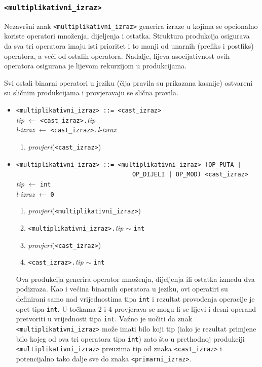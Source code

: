 \documentclass[times, 12pt, utf8]{book}
\begin{document}
\subsubsection{\texttt{<multiplikativni\_izraz>}}

Nezavršni znak \verb|<multiplikativni_izraz>| generira izraze u kojima se opcionalno koriste operatori množenja, dijeljenja i ostatka.
Struktura produkcija osigurava da sva tri operatora imaju isti prioritet i to manji od unarnih (prefiks i postfiks) operatora, a veći od ostalih operatora.
Nadalje, lijeva asocijativnost ovih operatora osigurana je lijevom rekurzijom u produkcijama.

Svi ostali binarni operatori u jeziku (čija pravila su prikazana kasnije) ostvareni su sličnim produkcijama i provjeravaju se slična pravila.

\begin{itemize}

\item
\verb|<multiplikativni_izraz> ::= <cast_izraz>|\\
\emph{tip} \(\leftarrow\) \verb|<cast_izraz>.|\emph{tip}\\
\emph{l-izraz} \(\leftarrow\) \verb|<cast_izraz>.|\emph{l-izraz}
\begin{enumerate}
\item
\emph{provjeri}(\verb|<cast_izraz>|)
\end{enumerate}

\item
\verb#<multiplikativni_izraz> ::= <multiplikativni_izraz> (OP_PUTA | #\\
\verb#                                OP_DIJELI | OP_MOD) <cast_izraz>#\\
\emph{tip} \(\leftarrow\) \verb|int|\\
\emph{l-izraz} \(\leftarrow\) \verb|0|
\begin{enumerate}
\item
\emph{provjeri}(\verb|<multiplikativni_izraz>|)
\item
\verb|<multiplikativni_izraz>.|\emph{tip} \(\sim\) \verb|int|
\item
\emph{provjeri}(\verb|<cast_izraz>|)
\item
\verb|<cast_izraz>.|\emph{tip} \(\sim\) \verb|int|
\end{enumerate}

Ova produkcija generira operator množenja, dijeljenja ili ostatka između dva podizraza.
Kao i većina binarnih operatora u jeziku, ovi operatiri su definirani samo nad vrijednostima tipa \verb|int| i rezultat provođenja operacije je opet tipa \verb|int|.
U točkama 2 i 4 provjerava se mogu li se lijevi i desni operand pretvoriti u vrijednosti tipa \verb|int|.
Važno je uočiti da znak \verb|<multiplikativni_izraz>| može imati bilo koji tip (iako je rezultat primjene bilo kojeg od ova tri operatora tipa \verb|int|) zato što u prethodnoj produkciji \verb|<multiplikativni_izraz>| preuzima tip od znaka \verb|<cast_izraz>| i potencijalno tako dalje sve do znaka \verb|<primarni_izraz>|.

\end{itemize}
\end{document}
